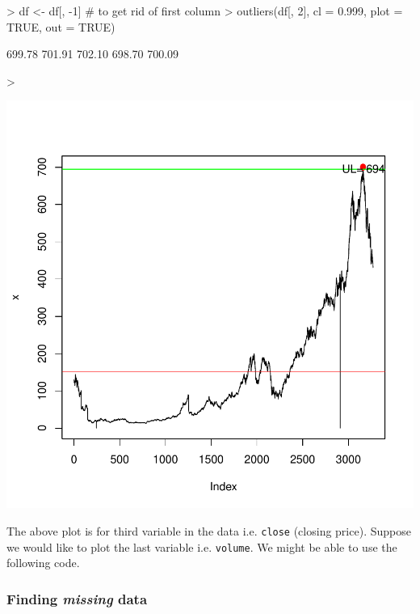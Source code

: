 \documentclass{article}
\begin{document}
\begin{Schunk}
\begin{Sinput}
> df <- df[, -1] # to get rid of first column
> outliers(df[, 2], cl = 0.999, plot = TRUE, out = TRUE)
\end{Sinput}
\begin{Soutput}
[1] 699.78 701.91 702.10 698.70 700.09
\end{Soutput}
\begin{Sinput}
> 
\end{Sinput}
\end{Schunk}
\includegraphics{anadetect-011}

The above plot is for third variable in the data i.e. \texttt{close} (closing price). Suppose we would like to plot the last variable i.e. \texttt{volume}. We might be able to use the following code. 

\subsubsection{Finding \emph{missing} data}
\end{document}

